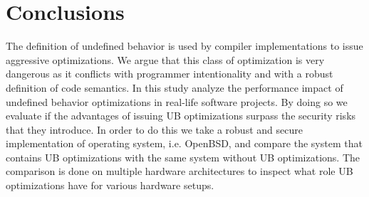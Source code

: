 \section{Conclusions} \label{sec:ccl}

The definition of undefined behavior is used by compiler
implementations to issue aggressive optimizations. We argue that this
class of optimization is very dangerous as it conflicts with programmer
intentionality and with a robust definition of code semantics. In this
study analyze the performance impact of undefined behavior optimizations
in real-life software projects. By doing so we evaluate if the
advantages of issuing UB optimizations surpass the security risks that
they introduce. In order to do this we take a robust and secure
implementation of operating system, i.e. OpenBSD, and compare the system
that contains UB optimizations with the same system without UB
optimizations. The comparison is done on multiple hardware architectures
to inspect what role UB optimizations have for various hardware setups.
